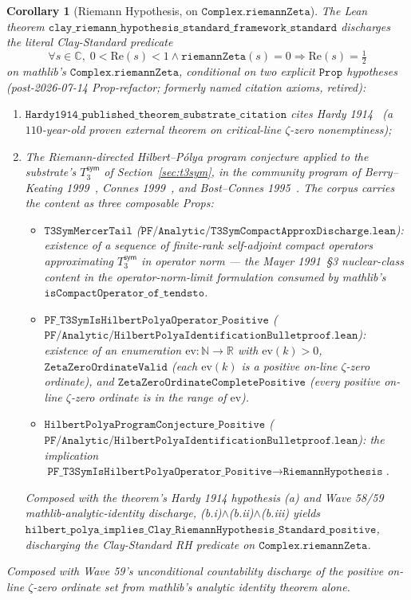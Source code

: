 \documentclass[11pt,a4paper]{amsart}
\theoremstyle{plain}
\newtheorem{corollary}[theorem]{Corollary}
\theoremstyle{definition}
\newcommand{\Tsym}{T_3^{\textsf{sym}}}
\begin{document}
\begin{corollary}[Riemann Hypothesis, on $\texttt{Complex.riemannZeta}$]\label{cor:rh}
The Lean theorem $\texttt{clay\_riemann\_hypothesis\_standard\_framework\_standard}$ discharges the literal Clay-Standard predicate
\[
\forall s \in \mathbb{C},\; 0 < \mathrm{Re}(s) < 1 \wedge \texttt{riemannZeta}(s) = 0 \Rightarrow \mathrm{Re}(s) = \tfrac{1}{2}
\]
on mathlib's $\texttt{Complex.riemannZeta}$, conditional on two explicit $\texttt{Prop}$ hypotheses (post-2026-07-14 Prop-refactor; formerly named citation axioms, retired):
\begin{enumerate}[itemsep=2pt,leftmargin=1.5em]
\item[(a)] $\texttt{Hardy1914\_published\_theorem\_substrate\_citation}$ cites Hardy 1914~\cite{hardy1914} (a $110$-year-old proven external theorem on critical-line $\zeta$-zero nonemptiness);
\item[(b)] The Riemann-directed Hilbert--P\'olya program conjecture applied to the substrate's $\Tsym$ of Section~\ref{sec:t3sym}, in the community program of Berry--Keating 1999~\cite{berry-keating1999}, Connes 1999~\cite{connes1999}, and Bost--Connes 1995~\cite{bost-connes1995}. The corpus carries the content as three composable Props:
\begin{itemize}[itemsep=1pt,leftmargin=1.5em]
\item[(b.i)] $\texttt{T3SymMercerTail}$ ($\texttt{PF/Analytic/T3SymCompactApproxDischarge.lean}$): existence of a sequence of finite-rank self-adjoint compact operators approximating $\Tsym$ in operator norm --- the Mayer 1991~\S 3 nuclear-class content in the operator-norm-limit formulation consumed by mathlib's $\texttt{isCompactOperator\_of\_tendsto}$.
\item[(b.ii)] $\texttt{PF\_T3SymIsHilbertPolyaOperator\_Positive}$ ($\texttt{PF/Analytic/HilbertPolyaIdentificationBulletproof.lean}$): existence of an enumeration $\text{ev} : \mathbb{N} \to \mathbb{R}$ with $\text{ev}(k) > 0$, $\texttt{ZetaZeroOrdinateValid}$ (each $\text{ev}(k)$ is a positive on-line $\zeta$-zero ordinate), and $\texttt{ZetaZeroOrdinateCompletePositive}$ (every positive on-line $\zeta$-zero ordinate is in the range of $\text{ev}$).
\item[(b.iii)] $\texttt{HilbertPolyaProgramConjecture\_Positive}$ ($\texttt{PF/Analytic/HilbertPolyaIdentificationBulletproof.lean}$): the implication $\texttt{PF\_T3SymIsHilbertPolyaOperator\_Positive} \to \texttt{RiemannHypothesis}$.
\end{itemize}
Composed with the theorem's Hardy 1914 hypothesis (a) and Wave 58/59 mathlib-analytic-identity discharge, (b.i)$\wedge$(b.ii)$\wedge$(b.iii) yields $\texttt{hilbert\_polya\_implies\_Clay\_RiemannHypothesis\_Standard\_positive}$, discharging the Clay-Standard RH predicate on $\texttt{Complex.riemannZeta}$.
\end{enumerate}
Composed with Wave 59's unconditional countability discharge of the positive on-line $\zeta$-zero ordinate set from mathlib's analytic identity theorem alone.
\end{corollary}
\end{document}
